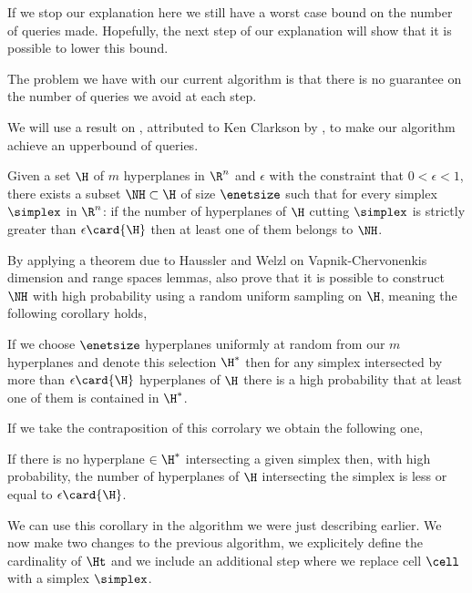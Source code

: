 
If we stop our explanation here we still have a worst case 
bound on the number of queries made. Hopefully, the next step of our
explanation will show that it is possible to lower this bound.

The problem we have with our current algorithm is that there is no guarantee
on the number of queries we avoid at each step.

We will use a result on \enets, attributed to Ken Clarkson by
\citet{burgisser:1997}, to make our algorithm achieve an upperbound
of  queries.

\begin{theorem}[Clarkson]
Given a set $\H$ of $m$ hyperplanes in $\R^n$ and $\epsilon$ with the
constraint that $0 < \epsilon < 1$, there exists a subset $\NH \subset \H$ of
size $\enetsize$ such that for every simplex $\simplex$ in $\R^n$: if the
number of hyperplanes of $\H$ cutting $\simplex$ is strictly greater than
$\epsilon \card{\H}$ then at least one of them belongs to $\NH$.
\end{theorem}

By applying a theorem due to Haussler and Welzl on Vapnik-Chervonenkis
dimension and range spaces lemmas, \citet{burgisser:1997} also prove that it is possible to
construct $\NH$ with high probability using a random uniform sampling on $\H$,
meaning the following corollary holds,

\begin{corollary}
If we choose $\enetsize$ hyperplanes uniformly at
random from our $m$ hyperplanes and denote this selection $\H^{*}$ then for
any simplex intersected by more than $\epsilon \card{\H}$ hyperplanes of $\H$
there is a high probability that at least one of them is contained in $\H^{*}$.
\end{corollary}

If we take the contraposition of this corrolary we obtain the following one,

\begin{corollary}
If there is no hyperplane $\in \H^{*}$ intersecting a given simplex then, with
high probability, the number of hyperplanes of $\H$ intersecting the simplex
is less or equal to $\epsilon \card{\H}$.
\end{corollary}

We can use this corollary in the algorithm we were just describing earlier. We
now make two changes to the previous algorithm, we explicitely define the
cardinality of $\Ht$ and we include an additional step where we replace cell
$\cell$ with a simplex $\simplex$.

